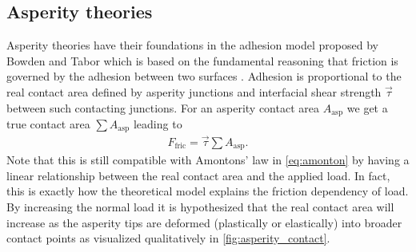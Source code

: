 \subsection{Asperity theories} %

Asperity theories have their foundations in the adhesion model proposed by Bowden and Tabor \cite{bowden2001friction} which is based on the fundamental reasoning that friction is governed by the adhesion between two surfaces \cite{Kim_2012}. Adhesion is proportional to the real contact area defined by asperity junctions and interfacial shear strength $\vec{\tau}$ between such contacting junctions. For an asperity contact area $A_{\text{asp}}$ we get a true contact area $\sum A_{\text{asp}}$ leading to 
\begin{align*}
  F_\text{fric} = \vec{\tau} \sum A_{\text{asp}}.
\end{align*}
Note that this is still compatible with Amontons’ law in \cref{eq:amonton} by having a linear relationship between the real contact area and the
applied load. In fact, this is exactly how the theoretical model explains the friction dependency of load. By increasing the normal load it is hypothesized that the real contact area will increase as the asperity tips are deformed (plastically or elastically) into broader contact points as visualized qualitatively in \cref{fig:asperity_contact}.


